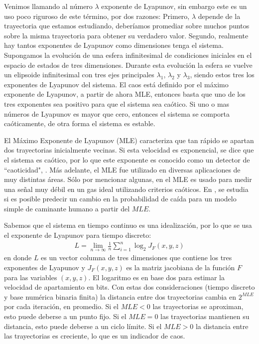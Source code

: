 Venimos llamando al número $\lambda$ exponente de Lyapunov, sin embargo este es un uso poco riguroso de este término, por dos razones:
Primero, $\lambda$ depende de la trayectoria que estamos estudiando, deberíamos promediar sobre muchos puntos sobre la misma trayectoria para obtener su verdadero valor.
Segundo, realmente hay tantos exponentes de Lyapunov como dimensiones tenga el sistema.
Supongamos la evolución de una esfera infinitesimal de condiciones iniciales en el espacio de estados de tres dimensiones.
Durante esta evolución la esfera se vuelve un elipsoide infinitesimal con tres ejes principales $\lambda_1$, $\lambda_2$ y $\lambda_3$, siendo estos tres los exponentes de Lyapunov del sistema.
El caos está definido por el máximo exponente de Lyapunov, a partir de ahora MLE, entonces basta que uno de los tres exponentes sea positivo para que el sistema sea caótico.
Si uno o mas números de Lyapunov es mayor que cero, entonces el sistema se comporta caóticamente, de otra forma el sistema es estable.

El Máximo Exponente de Lyapunov (MLE) caracteriza que tan rápido se apartan dos trayectorias inicialmente vecinas.
Si esta velocidad es exponencial, se dice que el sistema es caótico, por lo que este exponente es conocido como un detector de  ``caoticidad", \cite{strotgartz1994,Kantz1994,Sprott2003}.
Más adelante, el MLE fue utilizado en diversas aplicaciones de muy distintas áreas.
Sólo por mencionar algunas, en \cite{Ma2013} el MLE es usado para medir una señal muy débil en un gas ideal utilizando criterios caóticos.
En \cite{Bruijna2011}, se estudia si es posible predecir un cambio en la probabilidad de caída para un modelo simple de caminante humano a partir del $MLE$.

Sabemos que el sistema en tiempo continuo es una idealización, por lo que se usa el exponente de Lyapunov para tiempo discreto:
%
\begin{eqnarray}
\label{eq:LtdiscB2}
	L = \lim\limits_{n \to \infty} \frac{1}{n} \sum_{i=1}^{n} \log_2 J_F(x,y,z)
\end{eqnarray}
%
en donde $L$ es un vector columna de tres dimensiones que contiene los tres exponentes de Lyapunov y $J_F(x,y,z)$ es la matriz jacobiana de la función $F$ para las variables $(x,y,z)$.
El logaritmo es en base dos para estimar la velocidad de apartamiento en bits.
Con estas dos consideraciones (tiempo discreto y base numérica binaria finita) la distancia entre dos trayectorias cambia en $2^{MLE}$ por cada iteración, en promedio.
Si el $MLE<0$ las trayectorias se aproximan, esto puede deberse a un punto fijo.
Si el $MLE=0$ las trayectorias mantienen su distancia, esto puede deberse a un ciclo límite.
Si el $MLE>0$ la distancia entre las trayectorias es creciente, lo que es un indicador de caos.

